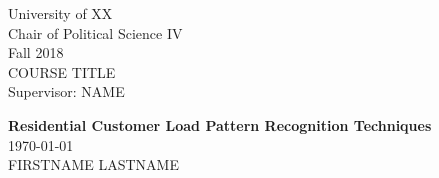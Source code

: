 


\begin{titlepage} %

	
\begin{minipage}{0.4\textwidth} %
    \begin{flushleft} %
    \large
    University of XX\\ %
    Chair of Political Science IV\\ %
    Fall 2018\\ %
    COURSE TITLE\\ %
    Supervisor: NAME %
    \end{flushleft}
\end{minipage}
	
\vspace*{2in} %
	
\center %

	
{\huge\bfseries Residential Customer Load Pattern Recognition Techniques}\\[0.4cm] %
{\large\today}\\[0.4cm] %
FIRSTNAME LASTNAME %
	
\vfill %


\vfill %


\end{titlepage}
